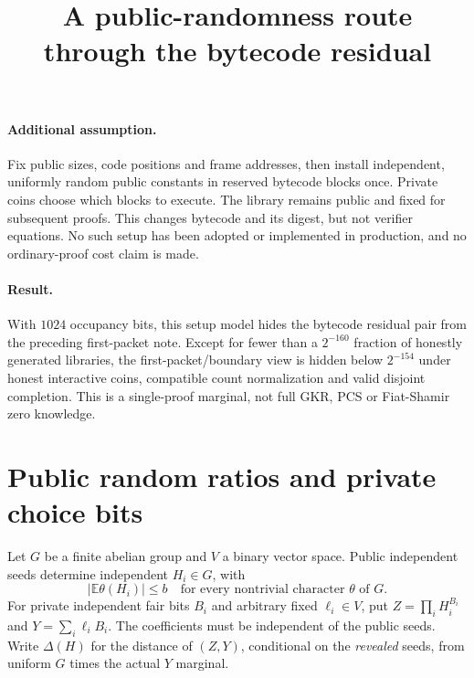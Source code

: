 \documentclass[11pt]{article}
\title{A public-randomness route through the bytecode residual}
\author{}
\date{}
\begin{document}
\maketitle
\vspace{-2em}

\paragraph{Additional assumption.} Fix public sizes, code positions and frame addresses, then install independent, uniformly random public constants in reserved bytecode blocks once. Private coins choose which blocks to execute. The library remains public and fixed for subsequent proofs. This changes bytecode and its digest, but not verifier equations. No such setup has been adopted or implemented in production, and no ordinary-proof cost claim is made.

\paragraph{Result.} With $1024$ occupancy bits, this setup model hides the bytecode residual pair from the preceding first-packet note. Except for fewer than a $2^{-160}$ fraction of honestly generated libraries, the first-packet/boundary view is hidden below $2^{-154}$ under honest interactive coins, compatible count normalization and valid disjoint completion. This is a single-proof marginal, not full GKR, PCS or Fiat-Shamir zero knowledge.

\section{Public random ratios and private choice bits}

Let $G$ be a finite abelian group and $V$ a binary vector space. Public independent seeds determine independent $H_i\in G$, with
\[
 |\mathbb E\theta(H_i)|\le b
 \quad\text{for every nontrivial character }\theta\text{ of }G.
\]
For private independent fair bits $B_i$ and arbitrary fixed $\ell_i\in V$, put $Z=\prod_iH_i^{B_i}$ and $Y=\sum_i\ell_iB_i$. The coefficients must be independent of the public seeds. Write $\Delta(H)$ for the distance of $(Z,Y)$, conditional on the \emph{revealed} seeds, from uniform $G$ times the actual $Y$ marginal.
\end{document}

